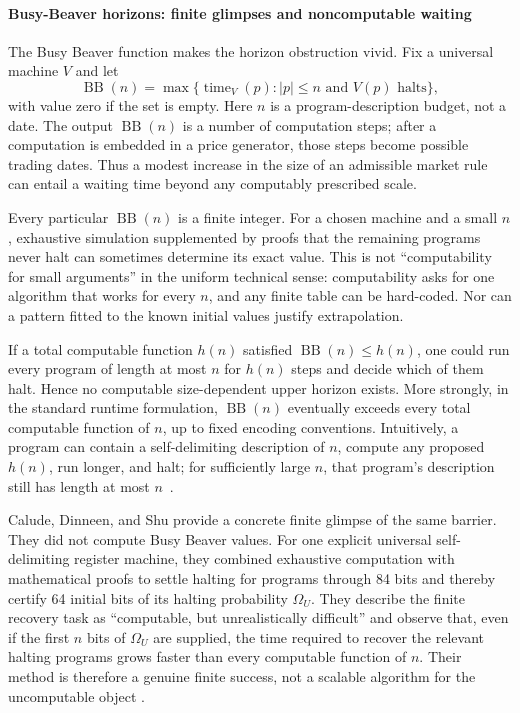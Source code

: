 \documentclass[aps,pra,reprint,superscriptaddress,amsmath,amssymb,floatfix]{revtex4-2}
\theoremstyle{plain}
\theoremstyle{definition}
\theoremstyle{remark}
\begin{document}
\paragraph{Busy-Beaver horizons: finite glimpses and noncomputable waiting}

The Busy Beaver function makes the horizon obstruction vivid. Fix a universal
machine \(V\) and let
\begin{equation}
  \operatorname{BB}(n)
  =
  \max\{\operatorname{time}_V(p):
  |p|\leq n\text{ and }V(p)\text{ halts}\},
  \label{eq:busybeaver}
\end{equation}
with value zero if the set is empty. Here \(n\) is a program-description budget,
not a date. The output \(\operatorname{BB}(n)\) is a number of computation
steps; after a computation is embedded in a price generator, those steps become
possible trading dates. Thus a modest increase in the size of an admissible
market rule can entail a waiting time beyond any computably prescribed scale.

Every particular \(\operatorname{BB}(n)\) is a finite integer. For a chosen
machine and a small \(n\), exhaustive simulation supplemented by proofs that
the remaining programs never halt can sometimes determine its exact value.
This is not ``computability for small arguments'' in the uniform technical
sense: computability asks for one algorithm that works for every \(n\), and any
finite table can be hard-coded. Nor can a pattern fitted to the known initial
values justify extrapolation.

If a total computable function \(h(n)\) satisfied
\(\operatorname{BB}(n)\leq h(n)\), one could run every program of length at most
\(n\) for \(h(n)\) steps and decide which of them halt. Hence no computable
size-dependent upper horizon exists. More strongly, in the standard runtime
formulation, \(\operatorname{BB}(n)\) eventually exceeds every total computable
function of \(n\), up to fixed encoding conventions. Intuitively, a program can
contain a self-delimiting description of \(n\), compute any proposed
\(h(n)\), run longer, and halt; for sufficiently large \(n\), that program's
description still has length at most \(n\)~\cite{rado,chaitin-bb}.

Calude, Dinneen, and Shu provide a concrete finite glimpse of the same barrier.
They did not compute Busy Beaver values. For one explicit universal
self-delimiting register machine, they combined exhaustive computation with
mathematical proofs to settle halting for programs through 84 bits and thereby
certify 64 initial bits of its halting probability \(\Omega_U\). They describe
the finite recovery task as ``computable, but unrealistically difficult'' and
observe that, even if the first \(n\) bits of \(\Omega_U\) are supplied, the
time required to recover the relevant halting programs grows faster than every
computable function of \(n\). Their method is therefore a genuine finite
success, not a scalable algorithm for the uncomputable object
\cite{2002-glimpseofran}.
\end{document}
